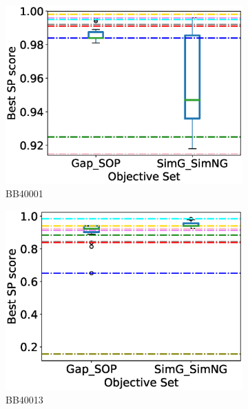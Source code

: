 \begin{figure}[!htbp]
\begin{adjustwidth}{-1cm}{-1cm}
		\begin{subfigure}{0.22\textwidth}
			\includegraphics[width=\columnwidth]{Figure/summary/precomputedInit/Balibase/BB40001_objset_pairs_rank_2}
			\caption{BB40001}
		\end{subfigure}	
		\begin{subfigure}{0.22\textwidth}
			\includegraphics[width=\columnwidth]{Figure/summary/precomputedInit/Balibase/BB40013_objset_pairs_rank_2}
			\caption{BB40013}
		\end{subfigure}
		\begin{subfigure}{0.22\textwidth}

\end{subfigure}
\end{adjustwidth}
\end{figure}
